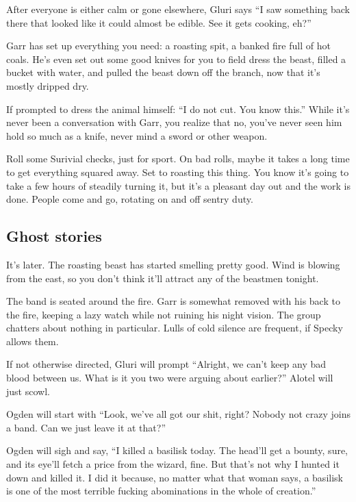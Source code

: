 \begin{multicols}{2}
  After everyone is either calm or gone elsewhere, Gluri says
  ``I saw something back there that looked like it could almost be edible.
    See it gets cooking, eh?''

  Garr has set up everything you need: a roasting spit, a banked fire full of hot coals.
  He's even set out some good knives for you to field dress the beast,
    filled a bucket with water, and pulled the beast down off the branch, now that it's mostly
    dripped dry.

  If prompted to dress the animal himself: ``I do not cut.  You know this.''
  While it's never been a conversation with Garr, you realize that no, you've never seen him hold
    so much as a knife, never mind a sword or other weapon.

  Roll some Surivial checks, just for sport.
  On bad rolls, maybe it takes a long time to get everything squared away.
  Set to roasting this thing.
  You know it's going to take a few hours of steadily turning it, but it's a pleasant day out
    and the work is done.
  People come and go, rotating on and off sentry duty.

\subsection{Ghost stories}

  It's later.
  The roasting beast has started smelling pretty good.
  Wind is blowing from the east, so you don't think it'll attract any of the beastmen tonight.

  The band is seated around the fire.
  Garr is somewhat removed with his back to the fire, keeping a lazy watch while not ruining his
    night vision.
  The group chatters about nothing in particular.
  Lulls of cold silence are frequent, if Specky allows them.

  If not otherwise directed, Gluri will prompt
  ``Alright, we can't keep any bad blood between us.
    What is it you two were arguing about earlier?''
  Alotel will just scowl.

  Ogden will start with
  ``Look, we've all got our shit, right?
    Nobody not crazy joins a band.
    Can we just leave it at that?''

  Ogden will sigh and say,
  ``I killed a basilisk today.
    The head'll get a bounty, sure, and its eye'll fetch a price from the wizard, fine.
    But that's not why I hunted it down and killed it.
    I did it because, no matter what that woman says, a basilisk is one of the most terrible
      fucking abominations in the whole of creation.''


\end{multicols}
